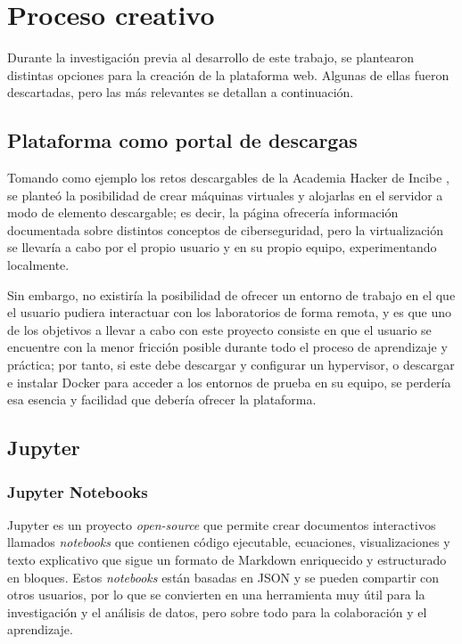                 

    \section{Proceso creativo}
        \label{sec:proceso-creativo}

        Durante la investigación previa al desarrollo de este trabajo, se plantearon distintas opciones para la creación de la plataforma web. Algunas de ellas fueron descartadas, pero las más relevantes se detallan a continuación.

        \subsection{Plataforma como portal de descargas}

            Tomando como ejemplo los retos descargables de la Academia Hacker de Incibe \cite{retos-INCIBE}, se planteó la posibilidad de crear máquinas virtuales y alojarlas en el servidor a modo de elemento descargable; es decir, la página ofrecería información documentada sobre distintos conceptos de ciberseguridad, pero la virtualización se llevaría a cabo por el propio usuario y en su propio equipo, experimentando localmente.

            Sin embargo, no existiría la posibilidad de ofrecer un entorno de trabajo en el que el usuario pudiera interactuar con los laboratorios de forma remota, y es que uno de los objetivos a llevar a cabo con este proyecto consiste en que el usuario se encuentre con la menor fricción posible durante todo el proceso de aprendizaje y práctica; por tanto, si este debe descargar y configurar un hypervisor, o descargar e instalar Docker para acceder a los entornos de prueba en su equipo, se perdería esa esencia y facilidad que debería ofrecer la plataforma.
            

        \subsection{Jupyter}

            \subsubsection{Jupyter Notebooks}
                
                Jupyter \cite{jupyter} es un proyecto \textit{open-source} que permite crear documentos interactivos llamados \textit{notebooks} que contienen código ejecutable, ecuaciones, visualizaciones y texto explicativo que sigue un formato de Markdown enriquecido y estructurado en bloques. Estos \textit{notebooks} están basadas en JSON y se pueden compartir con otros usuarios, por lo que se convierten en una herramienta muy útil para la investigación y el análisis de datos, pero sobre todo para la colaboración y el aprendizaje.
            
